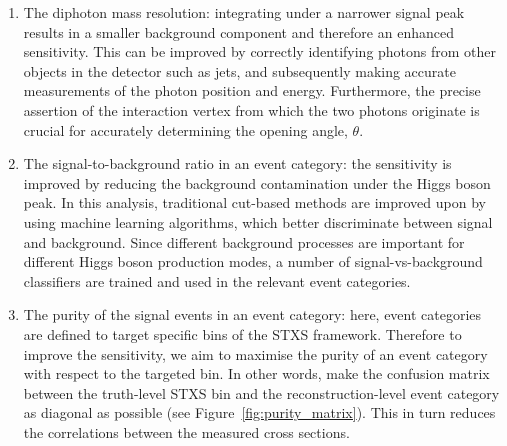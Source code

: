 \begin{enumerate}
    \item The diphoton mass resolution: integrating under a narrower signal peak results in a smaller background component and therefore an enhanced sensitivity. This can be improved by correctly identifying photons from other objects in the detector such as jets, and subsequently making accurate measurements of the photon position and energy. Furthermore, the precise assertion of the interaction vertex from which the two photons originate is crucial for accurately determining the opening angle, $\theta$.
    
    \item The signal-to-background ratio in an event category: the sensitivity is improved by reducing the background contamination under the Higgs boson peak. In this analysis, traditional cut-based methods are improved upon by using machine learning algorithms, which better discriminate between signal and background. Since different background processes are important for different Higgs boson production modes, a number of signal-vs-background classifiers are trained and used in the relevant event categories.
    
    \item The purity of the signal events in an event category: here, event categories are defined to target specific bins of the STXS framework. Therefore to improve the sensitivity, we aim to maximise the purity of an event category with respect to the targeted bin. In other words, make the confusion matrix between the truth-level STXS bin and the reconstruction-level event category as diagonal as possible (see Figure~\ref{fig:purity_matrix}). This in turn reduces the correlations between the measured cross sections.
\end{enumerate}

